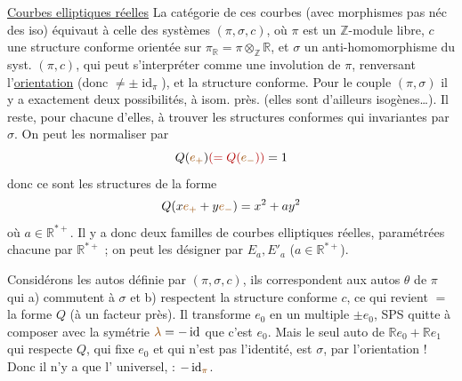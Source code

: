 \uline{Courbes elliptiques réelles}
 La catégorie de ces courbes
(avec morphismes pas néc des iso) équivaut à celle
des systèmes $(\pi,\sigma,c)$, où $\pi$ est un $\mathbb Z$-module
libre,  $c$ une structure  conforme orientée
sur $\pi_{\mathbb R}=\pi\otimes_{\mathbb Z}\mathbb R$, et $\sigma$ un anti-homomorphisme du
syst. $(\pi,c)$, qui peut s'interpréter comme une
involution de $\pi$, renversant l'\uline{orientation}
(donc $\ne\pm\operatorname{id}_\pi$),
et  la structure conforme. Pour le couple
$(\pi,\sigma)$ il y a exactement deux possibilités, à isom. près.
 (elles sont d'ailleurs isogènes\ldots). Il reste, pour chacune
d'elles, à trouver les structures conformes qui 
invariantes par $\sigma$. On peut les normaliser par \deleted{$\unsure{\sigma\circ\sigma}$}
\[
Q(\unsure{e_+})\deleted{(=Q(\unsure{e_-}))}=1
\]
donc ce sont les structures de la forme
\[
Q(x\unsure{e_+}+y\unsure{e_-})=x^2+ay^2
\]
où $a\in\mathbb R^{*+}$. Il y a donc deux familles de courbes
elliptiques réelles, paramétrées chacune par $\mathbb R^{*+}$ ; on peut
les désigner par $E_a,E'_a$ ($a\in\mathbb R^{*+}$). 

Considérons les autos 
définie par $(\pi,\sigma,c)$, ils correspondent aux 
autos $\theta$ de $\pi$ qui a) commutent à $\sigma$ et b) respectent la
structure conforme $c$,  
ce qui revient  $=$ 
la forme $Q$ (à un facteur près).
Il transforme  $e_0$ en un multiple  $\pm e_0$,
SPS quitte à composer avec la symétrie $\unsure{\lambda}=-\operatorname{id}$ que c'est $e_0$.
Mais le seul auto de $\mathbb R e_0+\mathbb R e_1$ qui respecte $Q$, qui fixe $e_0$ et qui
n'est pas l'identité, est $\sigma$,  par l'orientation !
Donc il n'y a que l' universel,  : $-\operatorname{id}_{\unsure{\pi}}$.

